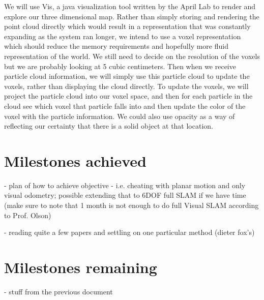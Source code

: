 \documentclass[12pt]{article}
\begin{document}
We will use Vis, a java visualization tool written by the April Lab to render and explore our three dimensional map.   Rather than simply storing and rendering the point cloud directly which would result in a representation that was constantly expanding as the system ran longer, we intend to use a voxel representation which should reduce the memory requirements and hopefully more fluid representation of the world.  We still need to decide on the resolution of the voxels but we are probably looking at 5 cubic centimeters.  Then when we receive particle cloud information, we will simply use this particle cloud to update the voxels, rather than displaying the cloud directly.   To update the voxels, we will project the particle cloud into our voxel space, and then for each particle in the cloud see which voxel that particle falls into and then update the color of the voxel with the particle information.  We could also use opacity as a way of reflecting our certainty that there is a solid object at that location. 

\section{Milestones achieved}
- plan of how to achieve objective - i.e. cheating with planar motion and only visual odometry; possible extending that to 6DOF full SLAM if we have time (make sure to note that 1 month is not enough to do full Visual SLAM according to Prof. Olson)

- reading quite a few papers and settling on one particular method (dieter fox's)

\section{Milestones remaining}
- stuff from the previous document
\end{document}

